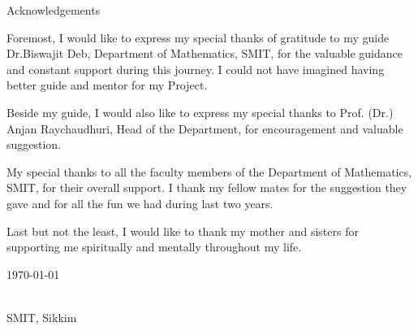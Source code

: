\begin{preface}{\sf Acknowledgements}
\baselineskip=18pt
 
Foremost, I would like to express my special thanks of gratitude to my guide Dr.Biswajit
Deb, Department of Mathematics, SMIT, for the valuable guidance and constant support during this journey. I could not have 
imagined having better guide and mentor for my Project.

Beside my guide, I would also like to express my special thanks to Prof. (Dr.) Anjan Raychaudhuri, Head of the Department, for 
encouragement and valuable suggestion.
 
My special thanks to all the faculty members of the Department of
Mathematics, SMIT, for their overall support.
I thank my fellow mates for the suggestion they gave and for all the fun we had during last two years.


Last but not the least, I would like to thank my mother and sisters for supporting me spiritually and mentally throughout my life.


\vspace{2.5cm}
\noindent
\begin{minipage}[t]{0.3\textwidth}
\hspace*{1pt}\today
\end{minipage}
\begin{minipage}[t]{0.65\textwidth}
\begin{flushright}
\hspace{0pt}\baselineskip=18pt
    {\bf  \authorname}\\
    SMIT, Sikkim\\
\end{flushright}
\end{minipage}
\end{preface} %
